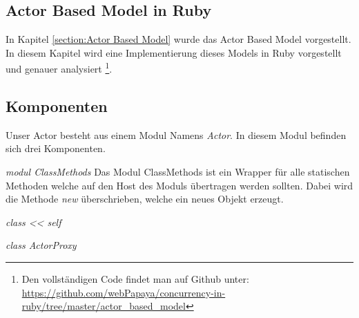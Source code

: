 \subsection{Actor Based Model in Ruby}

In Kapitel \ref{section:Actor Based Model} wurde das Actor Based Model vorgestellt. In diesem Kapitel wird eine Implementierung dieses Models in Ruby vorgestellt und genauer analysiert \footnote{Den vollständigen Code findet man auf Github unter: \url{https://github.com/webPapaya/concurrency-in-ruby/tree/master/actor_based_model}}. 



\subsection{Komponenten}

Unser Actor besteht aus einem Modul Namens \emph{Actor}. In diesem Modul befinden sich drei Komponenten.

\emph{modul ClassMethods}
Das Modul ClassMethods ist ein Wrapper für alle statischen Methoden welche auf den Host des Moduls übertragen werden sollten. Dabei wird die Methode \emph{new} überschrieben, welche ein neues Objekt erzeugt.  

\emph{class << self}



\emph{class ActorProxy}